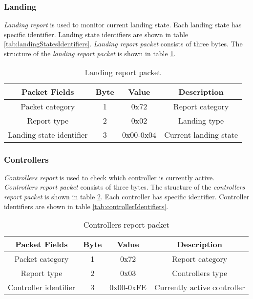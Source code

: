 \subsubsection{Landing}
\label{sec:landingReport}
\textit{Landing report} is used to monitor current landing state. Each landing state has specific identifier. Landing state identifiers are shown in table \ref{tab:landingStatesIdentifiers}.
\textit{Landing report packet} consists of three bytes. The structure of the \textit{landing report packet} is shown in table \ref{tab:landingReport}.
\begin{table}[H]
\begin{center}
\begin{tabular}{c c c c}
\toprule
\rowcolor[HTML]{FFFC9E} 
\textbf{Packet Fields}   & \textbf{Byte} & \textbf{Value} & \textbf{Description}  \\ \midrule
Packet category          & 1             & 0x72           & Report category       \\
Report type              & 2             & 0x02           & Landing type          \\
Landing state identifier & 3             & 0x00-0x04      & Current landing state
\end{tabular}
\end{center}
\caption{Landing report packet}
\label{tab:landingReport}
\end{table}



\subsubsection{Controllers}
\label{sec:ControllersReport}
\textit{Controllers report} is used to check which controller is currently active. \textit{Controllers report packet} consists of three bytes. The structure of the \textit{controllers report packet} is shown in table \ref{tab:controllersReport}. Each controller has specific identifier. Controller identifiers are shown in table \ref{tab:controllerIdentifiers}.
\begin{table}[H]
\begin{center}
\begin{tabular}{c c c c}
\toprule
\rowcolor[HTML]{FFFC9E} 
\textbf{Packet Fields} & \textbf{Byte} & \textbf{Value} & \textbf{Description}        \\ \midrule
Packet category        & 1             & 0x72           & Report category             \\
Report type            & 2             & 0x03           & Controllers type            \\
Controller identifier  & 3             & 0x00-0xFE      & Currently active controller
\end{tabular}
\end{center}
\caption{Controllers report packet}
\label{tab:controllersReport}
\end{table}


